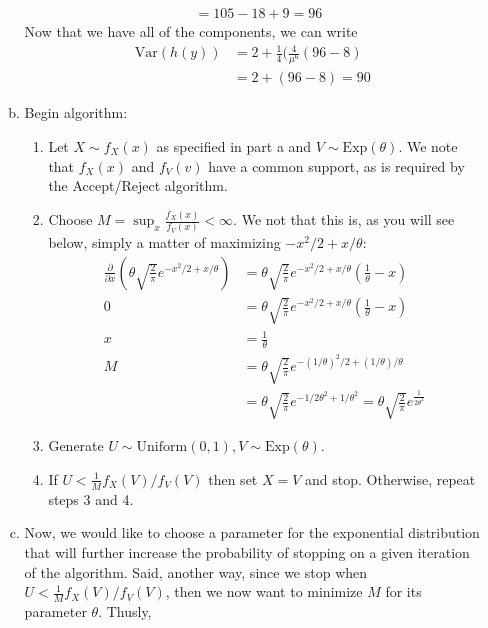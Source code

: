 \documentclass[11pt]{article}
\begin{document}
\begin{enumerate}[(a)]
\begin{enumerate}[(a)]
\begin{align*}
      &= 105 - 18 + 9 = 96
    \end{align*}
    Now that we have all of the components, we can write
    \begin{align*}
      \mathrm{Var}(h(y)) &= 2 + \frac{1}{4}(\frac{4}{\mu^6}(96-8) \\
      &= 2 + (96-8) = 90
    \end{align*}
\newpage
  \item Begin algorithm:
    \begin{enumerate}[(1)]
    \item Let $X \sim f_X(x)$ as specified in part a and
      $V \sim \mathrm{Exp}(\theta)$.  We note that $f_X(x)$ and
      $f_V(v)$ have a common support, as is required by the
      Accept/Reject algorithm.
    \item Choose $M = \sup_x \frac{f_X(x)}{f_V(x)} < \infty$.  We not
      that this is, as you will see below, simply a matter of
      maximizing $-x^2/2 + x/\theta$:
      \begin{align*}
        \frac{\partial}{\partial x} \left( \theta \sqrt{\frac{2}{\pi}}
        e^{-x^2/2 + x/\theta} \right) &= \theta \sqrt{\frac{2}{\pi}}
        e^{-x^2/2 + x/\theta} \left( \frac{1}{\theta} - x \right) \\
        0 &= \theta \sqrt{\frac{2}{\pi}} e^{-x^2/2 + x/\theta} \left(
            \frac{1}{\theta} - x \right) \\
        x &= \frac{1}{\theta} \\
        M &= \theta \sqrt{\frac{2}{\pi}} e^{-(1/\theta)^2/2 +
            (1/\theta)/\theta} \\
        &= \theta \sqrt{\frac{2}{\pi}} e^{-1/2\theta^2 +
            1/\theta^2} = \theta \sqrt{\frac{2}{\pi}} e^{\frac{1}{2\theta^2}}
      \end{align*}
    \item Generate $U \sim \mathrm{Uniform}(0,1), V \sim
      \mathrm{Exp}(\theta)$.
    \item If $U < \frac{1}{M} f_X(V)/f_V(V)$ then set $X=V$ and stop.
      Otherwise, repeat steps 3 and 4.
    \end{enumerate}
  \item Now, we would like to choose a parameter for the exponential
    distribution that will further increase the probability of
    stopping on a given iteration of the algorithm.  Said, another
    way, since we stop when $U < \frac{1}{M} f_X(V)/f_V(V)$, then we
    now want to minimize $M$ for its parameter $\theta$.  Thusly,
    \begin{align*}

\end{align*}
\end{enumerate}
\end{enumerate}
\end{document}
